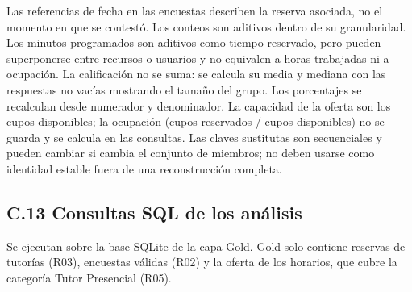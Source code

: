 \documentclass[11pt,letterpaper]{article}
\begin{document}
Las referencias de fecha en las encuestas describen la reserva asociada, no el momento en que se contestó. Los conteos son aditivos dentro de su granularidad. Los minutos programados son aditivos como tiempo reservado, pero pueden superponerse entre recursos o usuarios y no equivalen a horas trabajadas ni a ocupación. La calificación no se suma: se calcula su media y mediana con las respuestas no vacías mostrando el tamaño del grupo. Los porcentajes se recalculan desde numerador y denominador. La capacidad de la oferta son los cupos disponibles; la ocupación (cupos reservados / cupos disponibles) no se guarda y se calcula en las consultas. Las claves sustitutas son secuenciales y pueden cambiar si cambia el conjunto de miembros; no deben usarse como identidad estable fuera de una reconstrucción completa.

\subsection*{C.13 Consultas SQL de los análisis}

Se ejecutan sobre la base SQLite de la capa Gold. Gold solo contiene reservas de tutorías (R03), encuestas válidas (R02) y la oferta de los horarios, que cubre la categoría Tutor Presencial (R05).
\end{document}
